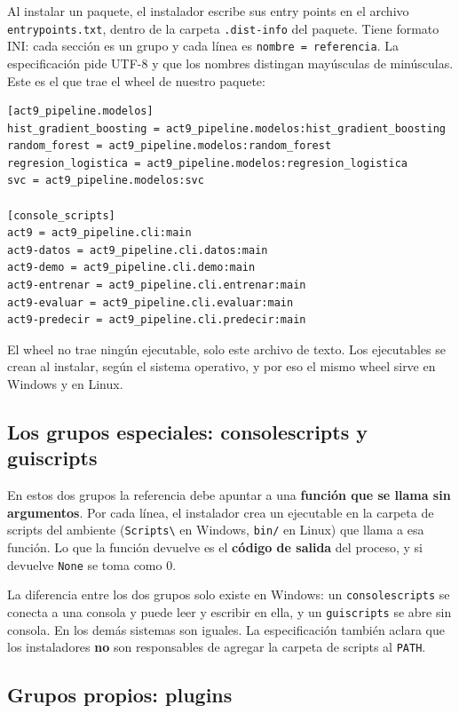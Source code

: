 \documentclass[12pt,a4paper]{article}
\renewcommand{\_}{\guionbajo\allowbreak}
\begin{document}
Al instalar un paquete, el instalador escribe sus entry points en el archivo
\texttt{entry\_points.txt}, dentro de la carpeta \texttt{.dist-info} del paquete. Tiene formato
INI: cada sección es un grupo y cada línea es \texttt{nombre = referencia}. La especificación pide
UTF-8 y que los nombres distingan mayúsculas de minúsculas. Este es el que trae el wheel de
nuestro paquete:

\begin{verbatim}
[act9_pipeline.modelos]
hist_gradient_boosting = act9_pipeline.modelos:hist_gradient_boosting
random_forest = act9_pipeline.modelos:random_forest
regresion_logistica = act9_pipeline.modelos:regresion_logistica
svc = act9_pipeline.modelos:svc

[console_scripts]
act9 = act9_pipeline.cli:main
act9-datos = act9_pipeline.cli.datos:main
act9-demo = act9_pipeline.cli.demo:main
act9-entrenar = act9_pipeline.cli.entrenar:main
act9-evaluar = act9_pipeline.cli.evaluar:main
act9-predecir = act9_pipeline.cli.predecir:main
\end{verbatim}

El wheel no trae ningún ejecutable, solo este archivo de texto. Los ejecutables se crean al
instalar, según el sistema operativo, y por eso el mismo wheel sirve en Windows y en Linux.

\subsection{Los grupos especiales: console\_scripts y gui\_scripts}

En estos dos grupos la referencia debe apuntar a una \textbf{función que se llama sin argumentos}.
Por cada línea, el instalador crea un ejecutable en la carpeta de scripts del ambiente
(\texttt{Scripts\textbackslash} en Windows, \texttt{bin/} en Linux) que llama a esa función. Lo que
la función devuelve es el \textbf{código de salida} del proceso, y si devuelve \texttt{None} se
toma como 0.

La diferencia entre los dos grupos solo existe en Windows: un \texttt{console\_scripts} se conecta
a una consola y puede leer y escribir en ella, y un \texttt{gui\_scripts} se abre sin consola. En
los demás sistemas son iguales. La especificación también aclara que los instaladores
\textbf{no} son responsables de agregar la carpeta de scripts al \texttt{PATH}.

\subsection{Grupos propios: plugins}
\end{document}
